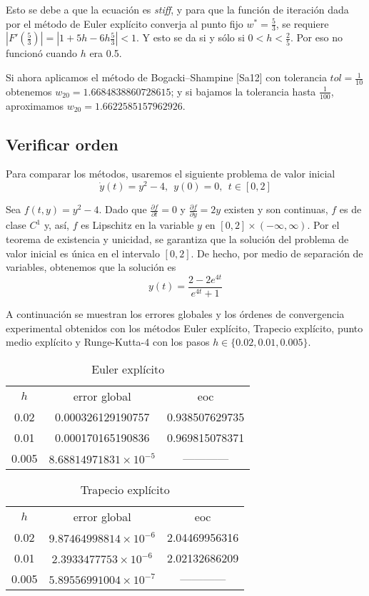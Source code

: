 \documentclass[spanish]{article}
\begin{document}
Esto se debe a que la ecuación es \textit{stiff}, y para que la función de iteración
dada por el método de Euler explícito converja al punto fijo $w^* = \frac{5}{3}$, se
requiere $|F'(\frac{5}{3})| = |1+5h-6h\frac{5}{3}|<1$. Y esto se da si y sólo si 
$0 < h < \frac{2}{5}$. Por eso no funcionó cuando $h$ era 0.5.

Si ahora aplicamos el método de Bogacki–Shampine [Sa12]  con tolerancia $tol = 
\frac{1}{10}$  obtenemos $w_{20} = 1.6684838860728615$; y si bajamos la tolerancia 
hasta  $\frac{1}{100}$, aproximamos $w_{20} = 1.6622585157962926$. 


\noindent
\subsection{Verificar orden}
Para comparar los métodos, usaremos el siguiente problema de valor inicial
$$
\dot{y}(t) = y^2-4, \ \ y(0) = 0,  \ \ t \in [0,2]
$$

Sea $f(t,y) = y^2-4$. Dado que $\frac{\partial f}{\partial t} = 0$ y $\frac{\partial f}{\partial y} = 2y$ existen y son continuas, $f$ es de clase $C^1$ y, así, $f$ es Lipschitz en la variable $y$ en $[0,2] \times (- \infty, \infty)$. Por el teorema de existencia y unicidad, se garantiza que la solución del problema de valor inicial es única en el intervalo $[0,2]$. De hecho, por medio de separación de variables, obtenemos que la solución es
$$
y(t) = \frac{2-2e^{4t}}{e^{4t}+1}
$$ 

A continuación se muestran los errores globales y los órdenes de convergencia experimental obtenidos con los métodos Euler explícito, Trapecio explícito, punto medio explícito y Runge-Kutta-4 con los pasos $h \in \{ 0.02, 0.01, 0.005 \}$.

\begin{table}[h]
\caption{Euler explícito}
\centering
\begin{tabular}{ccc}
\hline \hline
$h$ & error global & eoc  \\
0.02 & 0.000326129190757 & 0.938507629735  \\
0.01 & 0.000170165190836 & 0.969815078371 \\
0.005 & $8.68814971831 \times 10^{-5}$ & ------------  \\
\hline
\end{tabular}
\label{tab:hresult}
\end{table}

\begin{table}[h]
\caption{Trapecio explícito}
\centering
\begin{tabular}{ccc}
\hline \hline
$h$ & error global & eoc \\
0.02 & $9.87464998814 \times 10^{-6}$ & 2.04469956316 \\
0.01 & $2.3933477753 \times 10^{-6}$ & 2.02132686209 \\
0.005 & $5.89556991004 \times 10^{-7}$  & ------------ \\
\hline
\end{tabular}
\label{tab:hresult}
\end{table}
\end{document}

